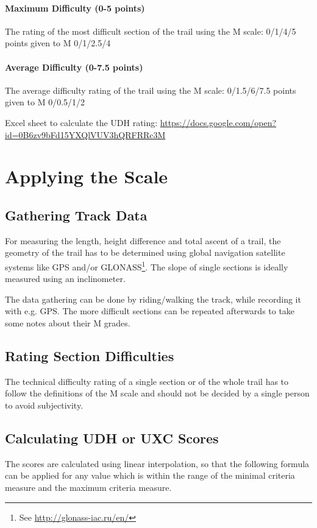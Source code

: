 \documentclass[a4paper,oneside]{scrartcl}
\begin{document}
\paragraph{Maximum Difficulty (0-5 points)}
The rating of the most difficult section of the trail using the M scale: 0/1/4/5
points given to M 0/1/2.5/4

\paragraph{Average Difficulty (0-7.5 points)} 
The average difficulty rating of the trail using the M scale: 0/1.5/6/7.5 points
given to M 0/0.5/1/2

Excel sheet to calculate the UDH rating: \url{https://docs.google.com/open?id=0B6zv9bFd15YXQlVUV3hQRFRRc3M}


\section{Applying the Scale}

\subsection{Gathering Track Data}
For measuring the length, height difference and total ascent of a trail, the
geometry of the trail has to be determined using global navigation satellite
systems like GPS and/or GLONASS\footnote{See \url{http://glonass-iac.ru/en/}}.
The slope of single sections is ideally measured using an inclinometer.

The data gathering can be done by riding/walking the track, while recording it
with e.g. GPS. The more difficult sections can be repeated afterwards to take
some notes about their M grades.

\subsection{Rating Section Difficulties}
The technical difficulty rating of a single section or of the whole trail has to
follow the definitions of the M scale and should not be decided by a single
person to avoid subjectivity.


\subsection{Calculating UDH or UXC Scores}
The scores are calculated using linear interpolation, so that the following formula can be applied for any value which is
within the range of the minimal criteria measure and the maximum criteria measure.
\end{document}
